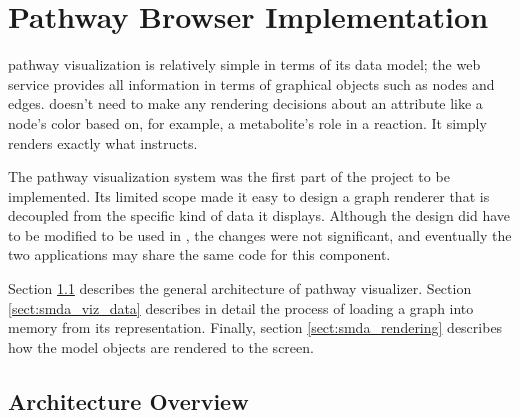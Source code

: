 \section{Pathway Browser Implementation}
\label{sect:maw_implementation}

\mawappp pathway visualization is relatively simple in terms of its data model;
the \pathcasemaw web service provides all information in terms of graphical
objects such as nodes and edges. \mawapp doesn't need to make any rendering
decisions about an attribute like a node's color based on, for example, a
metabolite's role in a reaction. It simply renders exactly what \pathcasemaw
instructs.

The pathway visualization system was the first part of the project to be
implemented. Its limited scope made it easy to design a graph renderer that is
decoupled from the specific kind of data it displays. Although the design did
have to be modified to be used in \keggapp, the changes were not significant,
and eventually the two applications may share the same code for this component.

Section \ref{sect:smda_arch_overview} describes the general architecture of
\mawappp pathway visualizer. Section \ref{sect:smda_viz_data} describes in
detail the process of loading a graph into memory from its \pathcasemaw
representation. Finally, section \ref{sect:smda_rendering} describes how the
model objects are rendered to the screen.

\subsection{Architecture Overview}
\label{sect:smda_arch_overview}

